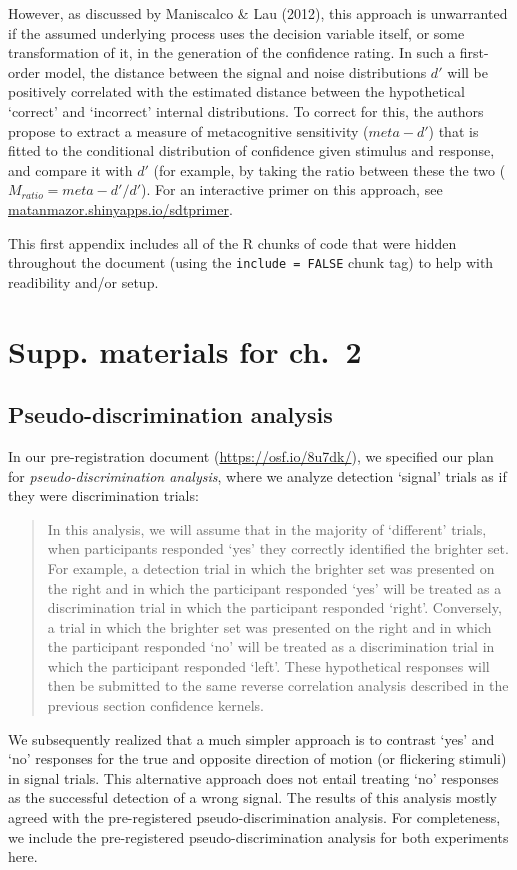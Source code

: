 \documentclass[12pt,twoside]{reedthesis}
\begin{document}
However, as discussed by Maniscalco \& Lau (2012), this approach is unwarranted if the assumed underlying process uses the decision variable itself, or some transformation of it, in the generation of the confidence rating. In such a first-order model, the distance between the signal and noise distributions \(d'\) will be positively correlated with the estimated distance between the hypothetical `correct' and `incorrect' internal distributions. To correct for this, the authors propose to extract a measure of metacognitive sensitivity (\(meta-d'\)) that is fitted to the conditional distribution of confidence given stimulus and response, and compare it with \(d'\) (for example, by taking the ratio between these the two (\(M_{ratio}=meta-d'/d'\)). For an interactive primer on this approach, see \url{matanmazor.shinyapps.io/sdtprimer}.

This first appendix includes all of the R chunks of code that were hidden throughout the document (using the \texttt{include\ =\ FALSE} chunk tag) to help with readibility and/or setup.

\hypertarget{supp.-materials-for-ch.-2}{%
\chapter{Supp. materials for ch.~2}\label{supp.-materials-for-ch.-2}}

\hypertarget{app2:PDRC}{%
\section{Pseudo-discrimination analysis}\label{app2:PDRC}}

In our pre-registration document (\url{https://osf.io/8u7dk/}), we specified our plan for \emph{pseudo-discrimination analysis}, where we analyze detection `signal' trials as if they were discrimination trials:
\begin{quote}
In this analysis, we will assume that in the majority of `different' trials, when participants responded `yes' they correctly identified the brighter set. For example, a detection trial in which the brighter set was presented on the right and in which the participant responded `yes' will be treated as a discrimination trial in which the participant responded `right'. Conversely, a trial in which the brighter set was presented on the right and in which the participant responded `no' will be treated as a discrimination trial in which the participant responded `left'. These hypothetical responses will then be submitted to the same reverse correlation analysis described in the previous section confidence kernels.
\end{quote}
We subsequently realized that a much simpler approach is to contrast `yes' and `no' responses for the true and opposite direction of motion (or flickering stimuli) in signal trials. This alternative approach does not entail treating `no' responses as the successful detection of a wrong signal. The results of this analysis mostly agreed with the pre-registered pseudo-discrimination analysis. For completeness, we include the pre-registered pseudo-discrimination analysis for both experiments here.
\end{document}
